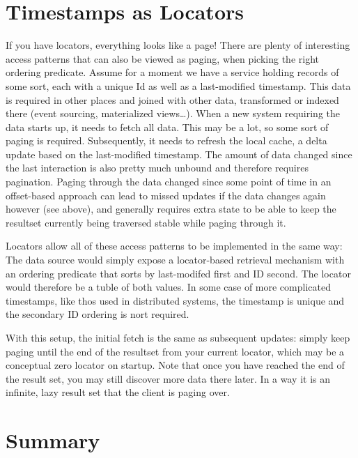 \documentclass[11pt,a4paper]{article}
\begin{document}
\begin{multicols}{2}


\section*{Timestamps as Locators}
If you have locators, everything looks like a page! There are plenty of
interesting access patterns that can also be viewed as paging, when picking the
right ordering predicate. Assume for a moment we have a service holding records
of some sort, each with a unique Id as well as a last-modified timestamp. This
data is required in other places and joined with other data, transformed or
indexed there (event sourcing, materialized views\ldots). When a new system
requiring the data starts up, it needs to fetch all data. This may be a lot, so
some sort of paging is required. Subsequently, it needs to refresh the local
cache, a delta update based on the last-modified timestamp. The amount of data
changed since the last interaction is also pretty much unbound and therefore
requires pagination. Paging through the data changed since some point of time
in an offset-based approach can lead to missed updates if the data changes again
however (see above), and generally requires extra state to be able to keep the
resultset currently being traversed stable while paging through it. 

Locators allow all of these access patterns to be implemented in the same way:
The data source would simply expose a locator-based retrieval mechanism with an
ordering predicate that sorts by last-modifed first and ID second. The locator 
would therefore be a tuble of both values. In some case of more complicated
timestamps, like thos used in distributed systems, the timestamp is unique and
the secondary ID ordering is nort required. 

With this setup, the initial fetch is the same as subsequent updates: simply
keep paging until the end of the resultset from your current locator, which may
be a conceptual zero locator on startup. Note that once you have reached the end
of the result set, you may still discover more data there later. In a way it is
an infinite, lazy result set that the client is paging over.

\section*{Summary}

\end{multicols}
\end{document}

